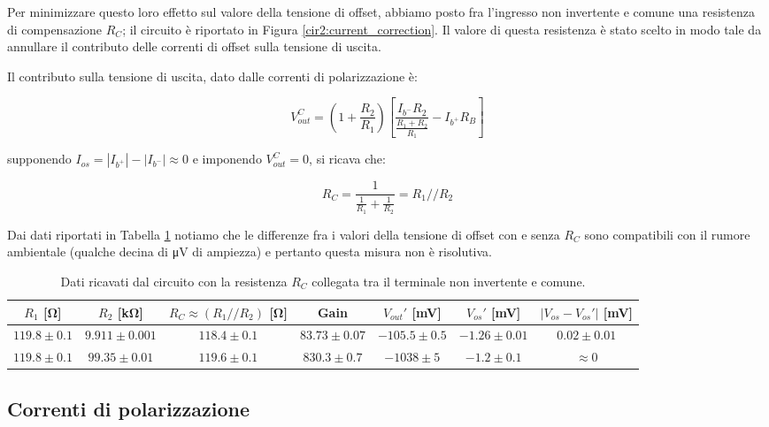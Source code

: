 Per minimizzare questo loro effetto sul valore della tensione di offset, abbiamo posto fra l'ingresso non invertente e comune una resistenza di compensazione $R_C$; il circuito è riportato in Figura \ref{cir2:current_correction}. Il valore di questa resistenza è stato scelto in modo tale da annullare il contributo delle correnti di offset sulla tensione di uscita.

Il contributo sulla tensione di uscita, dato dalle correnti di polarizzazione è:

\begin{equation}
V_{out}^{C} = \left( 1+\frac{R_2}{R_1} \right)\left[ \frac{I_{b^-}R_2}{\frac{R_1+R_2}{R_1}} - I_{b^+} R_B\right]
\label{eq2:Vout_currents}
\end{equation}

supponendo $I_{os} = |I_{b^+}|-|I_{b^-}| \approx 0$ e imponendo $V_{out}^{C}=0$, si ricava che:

$$R_C=\frac{1}{\frac{1}{R_1} + \frac{1}{R_2}} = R_1 // R_2$$

Dai dati riportati in Tabella \ref{tab2:RC} notiamo che le differenze fra i valori della tensione di offset con e senza $R_C$ sono compatibili con il rumore ambientale (qualche decina di \si{\micro\volt} di ampiezza) e pertanto questa misura non è risolutiva.

\begin{table}[H]
\begin{center}
{\renewcommand{\arraystretch}{1.2}%
\begin{tabular}{c|c|c|c|c|c|c}
$R_1$ [\si{\ohm}] & $R_2$ [\si{\kilo\ohm}] & $R_C \approx (R_1 // R_2)$ [\si{\ohm}] & Gain & $V_{out}'$  [\si{\milli\volt}] & $V_{os}'$ [\si{\milli\volt}] & $|V_{os}-V_{os}'|$ [\si{\milli\volt}] \\ 
\hline 
$119.8\pm0.1$ & $9.911\pm0.001$ & $118.4\pm0.1$ & $83.73 \pm 0.07$ & $-105.5 \pm 0.5$ & $-1.26 \pm0.01$ & $0.02\pm0.01$ \\
\hline
$119.8\pm0.1$ & $99.35\pm0.01$ & $119.6\pm0.1$ & $830.3\pm0.7$ &$ -1038 \pm 5$ & $-1.2 \pm 0.1$ & $\approx 0$\\
\end{tabular}}
\end{center}
\caption{Dati ricavati dal circuito con la resistenza $R_C$ collegata tra il terminale non invertente e comune.}
\label{tab2:RC}
\end{table}

\newpage
\subsection{Correnti di polarizzazione}

